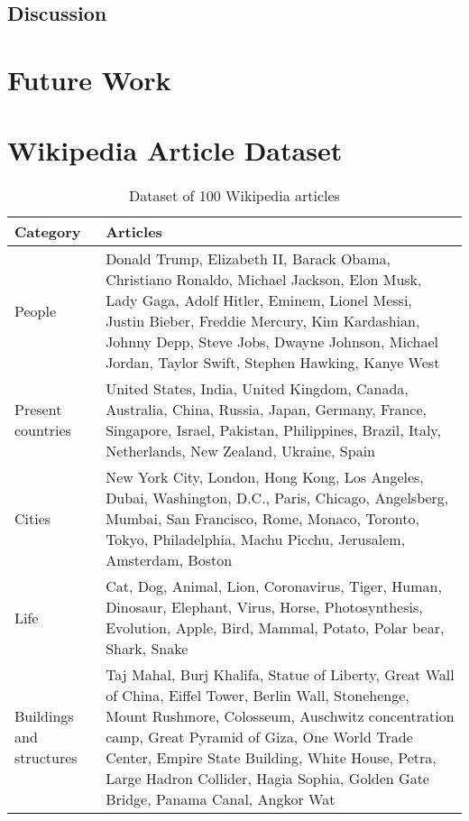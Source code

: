 \documentclass[12pt,oneside]{memoir}
\begin{document}
\section{Discussion}

\chapter{Future Work}

\printbibliography[title={References}]

\clearpage
\appendix
\renewcommand{\chaptername}{Appendix}

\chapter{Wikipedia Article Dataset}

\begin{table}[h]
    \centering
    \begin{tabular}{p{1in}p{3.8in}}
        \toprule
        \textbf{Category} & \textbf{Articles} \\
        \midrule
        People & Donald Trump, Elizabeth II, Barack Obama, Christiano Ronaldo, Michael Jackson, Elon Musk, Lady Gaga, Adolf Hitler, Eminem, Lionel Messi, Justin Bieber, Freddie Mercury, Kim Kardashian, Johnny Depp, Steve Jobs, Dwayne Johnson, Michael Jordan, Taylor Swift, Stephen Hawking, Kanye West\\
        \midrule
        Present countries & United States, India, United Kingdom, Canada, Australia, China, Russia, Japan, Germany, France, Singapore, Israel, Pakistan, Philippines, Brazil, Italy, Netherlands, New Zealand, Ukraine, Spain\\
        \midrule
        Cities & New York City, London, Hong Kong, Los Angeles, Dubai, Washington, D.C., Paris, Chicago, Angelsberg, Mumbai, San Francisco, Rome, Monaco, Toronto, Tokyo, Philadelphia, Machu Picchu, Jerusalem, Amsterdam, Boston\\
        \midrule
        Life & Cat, Dog, Animal, Lion, Coronavirus, Tiger, Human, Dinosaur, Elephant, Virus, Horse, Photosynthesis, Evolution, Apple, Bird, Mammal, Potato, Polar bear, Shark, Snake\\
        \midrule
        Buildings and structures & Taj Mahal, Burj Khalifa, Statue of Liberty, Great Wall of China, Eiffel Tower, Berlin Wall, Stonehenge, Mount Rushmore, Colosseum, Auschwitz concentration camp, Great Pyramid of Giza, One World Trade Center, Empire State Building, White House, Petra, Large Hadron Collider, Hagia Sophia, Golden Gate Bridge, Panama Canal, Angkor Wat\\
        \bottomrule
    \end{tabular}
    \caption{Dataset of 100 Wikipedia articles}
    \label{table:dataset}
\end{table}
\end{document}
